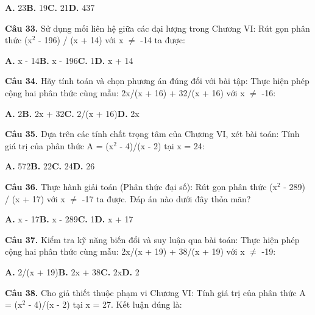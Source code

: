 \documentclass[11pt,a4paper]{article}
\begin{document}
\hspace*{1.5em}\textbf{A.} 23\quad\quad \textbf{B.} 19\quad\quad \textbf{C.} 21\quad\quad \textbf{D.} 437\par\vspace{2pt}
\textbf{\color{primary} Câu 33.} Sử dụng mối liên hệ giữa các đại lượng trong Chương VI: Rút gọn phân thức (x$^2$ - 196) / (x + 14) với x $\ne$ -14 ta được:\par
\hspace*{1.5em}\textbf{A.} x - 14\quad\quad \textbf{B.} x - 196\quad\quad \textbf{C.} 1\quad\quad \textbf{D.} x + 14\par\vspace{2pt}
\textbf{\color{primary} Câu 34.} Hãy tính toán và chọn phương án đúng đối với bài tập: Thực hiện phép cộng hai phân thức cùng mẫu: 2x/(x + 16) + 32/(x + 16) với x $\ne$ -16:\par
\hspace*{1.5em}\textbf{A.} 2\quad\quad \textbf{B.} 2x + 32\quad\quad \textbf{C.} 2/(x + 16)\quad\quad \textbf{D.} 2x\par\vspace{2pt}
\textbf{\color{primary} Câu 35.} Dựa trên các tính chất trọng tâm của Chương VI, xét bài toán: Tính giá trị của phân thức A = (x$^2$ - 4)/(x - 2) tại x = 24:\par
\hspace*{1.5em}\textbf{A.} 572\quad\quad \textbf{B.} 22\quad\quad \textbf{C.} 24\quad\quad \textbf{D.} 26\par\vspace{2pt}
\textbf{\color{primary} Câu 36.} Thực hành giải toán (Phân thức đại số): Rút gọn phân thức (x$^2$ - 289) / (x + 17) với x $\ne$ -17 ta được. Đáp án nào dưới đây thỏa mãn?\par
\hspace*{1.5em}\textbf{A.} x - 17\quad\quad \textbf{B.} x - 289\quad\quad \textbf{C.} 1\quad\quad \textbf{D.} x + 17\par\vspace{2pt}
\textbf{\color{primary} Câu 37.} Kiểm tra kỹ năng biến đổi và suy luận qua bài toán: Thực hiện phép cộng hai phân thức cùng mẫu: 2x/(x + 19) + 38/(x + 19) với x $\ne$ -19:\par
\hspace*{1.5em}\textbf{A.} 2/(x + 19)\quad\quad \textbf{B.} 2x + 38\quad\quad \textbf{C.} 2x\quad\quad \textbf{D.} 2\par\vspace{2pt}
\textbf{\color{primary} Câu 38.} Cho giả thiết thuộc phạm vi Chương VI: Tính giá trị của phân thức A = (x$^2$ - 4)/(x - 2) tại x = 27. Kết luận đúng là:\par
\end{document}
